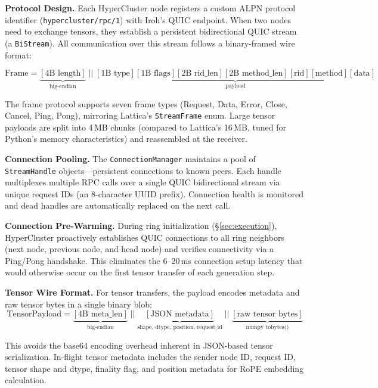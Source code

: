 \documentclass[runningheads]{llncs}
\begin{document}
\smallskip
\noindent\textbf{Protocol Design.} Each HyperCluster node registers a custom ALPN protocol identifier (\texttt{hypercluster/rpc/1}) with Iroh's QUIC endpoint. When two nodes need to exchange tensors, they establish a persistent bidirectional QUIC stream (a \texttt{BiStream}). All communication over this stream follows a binary-framed wire format:

\begin{equation}
\text{Frame} = \underbrace{[4\text{B length}]}_{\text{big-endian}} \;||\; \underbrace{[1\text{B type}][1\text{B flags}][2\text{B rid\_len}][2\text{B method\_len}][\text{rid}][\text{method}][\text{data}]}_{\text{payload}}
\label{eq:frame}
\end{equation}

The frame protocol supports seven frame types (Request, Data, Error, Close, Cancel, Ping, Pong), mirroring Lattica's \texttt{StreamFrame} enum. Large tensor payloads are split into 4\,MB chunks (compared to Lattica's 16\,MB, tuned for Python's memory characteristics) and reassembled at the receiver.

\smallskip
\noindent\textbf{Connection Pooling.} The \texttt{ConnectionManager} maintains a pool of \texttt{StreamHandle} objects---persistent connections to known peers. Each handle multiplexes multiple RPC calls over a single QUIC bidirectional stream via unique request IDs (an 8-character UUID prefix). Connection health is monitored and dead handles are automatically replaced on the next call.

\smallskip
\noindent\textbf{Connection Pre-Warming.} During ring initialization (\S\ref{sec:execution}), HyperCluster proactively establishes QUIC connections to all ring neighbors (next node, previous node, and head node) and verifies connectivity via a Ping/Pong handshake. This eliminates the 6--20\,ms connection setup latency that would otherwise occur on the first tensor transfer of each generation step.

\smallskip
\noindent\textbf{Tensor Wire Format.} For tensor transfers, the payload encodes metadata and raw tensor bytes in a single binary blob:
\begin{equation}
\text{TensorPayload} = \underbrace{[4\text{B meta\_len}]}_{\text{big-endian}} \;||\; \underbrace{[\text{JSON metadata}]}_{\text{shape, dtype, position, request\_id}} \;||\; \underbrace{[\text{raw tensor bytes}]}_{\text{numpy tobytes()}}
\label{eq:tensor_wire}
\end{equation}

\noindent This avoids the base64 encoding overhead inherent in JSON-based tensor serialization. In-flight tensor metadata includes the sender node ID, request ID, tensor shape and dtype, finality flag, and position metadata for RoPE embedding calculation.
\end{document}
